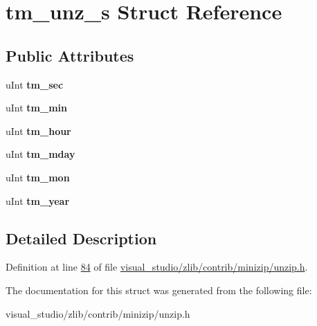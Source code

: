 \hypertarget{structtm__unz__s}{}\section{tm\+\_\+unz\+\_\+s Struct Reference}
\label{structtm__unz__s}
\subsection*{Public Attributes}
\begin{DoxyCompactItemize}
\item 
\mbox{\label{structtm__unz__s_ab91e69a9869e5db5be51b1aebaa5ea0d}} 
u\+Int {\bfseries tm\+\_\+sec}
\item 
\mbox{\label{structtm__unz__s_ac5a6bf08a4c5db8ae2243d4f0c35b192}} 
u\+Int {\bfseries tm\+\_\+min}
\item 
\mbox{\label{structtm__unz__s_ada09255f794d6c2db07ef73b77266b9c}} 
u\+Int {\bfseries tm\+\_\+hour}
\item 
\mbox{\label{structtm__unz__s_a51ed1873e1dcabf08ff0f85caf8aefee}} 
u\+Int {\bfseries tm\+\_\+mday}
\item 
\mbox{\label{structtm__unz__s_a4f5e461d8cad18d1aff7ec012168111d}} 
u\+Int {\bfseries tm\+\_\+mon}
\item 
\mbox{\label{structtm__unz__s_a5f17147e3cfbbfdbeb2e29cbc1df8136}} 
u\+Int {\bfseries tm\+\_\+year}
\end{DoxyCompactItemize}


\subsection{Detailed Description}


Definition at line \hyperlink{visual__studio_2zlib_2contrib_2minizip_2unzip_8h_source_l00084}{84} of file \hyperlink{visual__studio_2zlib_2contrib_2minizip_2unzip_8h_source}{visual\+\_\+studio/zlib/contrib/minizip/unzip.\+h}.



The documentation for this struct was generated from the following file\+:\begin{DoxyCompactItemize}
\item 
visual\+\_\+studio/zlib/contrib/minizip/unzip.\+h\end{DoxyCompactItemize}
